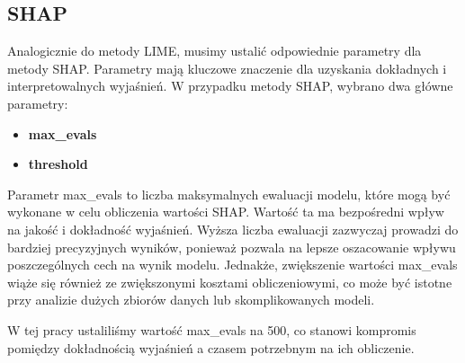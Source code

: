 \subsection*{SHAP}
Analogicznie do metody LIME, musimy ustalić odpowiednie parametry dla metody SHAP.
Parametry mają kluczowe znaczenie dla uzyskania dokładnych i interpretowalnych wyjaśnień.
W przypadku metody SHAP, wybrano dwa główne parametry:
\begin{itemize}
	\item \textbf{max\_evals}
	\item \textbf{threshold}
\end{itemize}

Parametr max\_evals to liczba maksymalnych ewaluacji modelu, które mogą być wykonane w celu obliczenia wartości SHAP.
Wartość ta ma bezpośredni wpływ na jakość i dokładność wyjaśnień.
Wyższa liczba ewaluacji zazwyczaj prowadzi do bardziej precyzyjnych wyników, ponieważ pozwala na lepsze oszacowanie wpływu poszczególnych cech na wynik modelu.
Jednakże, zwiększenie wartości max\_evals wiąże się również ze zwiększonymi kosztami obliczeniowymi, co może być istotne przy analizie dużych zbiorów danych lub skomplikowanych modeli.

W tej pracy ustaliliśmy wartość max\_evals na 500, co stanowi kompromis pomiędzy dokładnością wyjaśnień a czasem potrzebnym na ich obliczenie.

